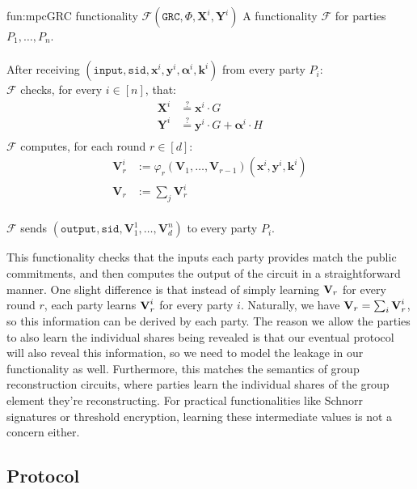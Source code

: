 \begin{afunctionality}{fun:mpc}{GRC functionality $\mathcal{F}(\texttt{GRC}, \Phi, \textbf{X}^i, \textbf{Y}^i)$}
A functionality $\mathcal{F}$ for parties $P_1, \ldots, P_n$.\\
\\
After receiving
$(\texttt{input}, \texttt{sid}, \textbf{x}^i, \textbf{y}^i, \boldsymbol{\alpha}^i, \textbf{k}^i)$ from every party $P_i$:\\
$\mathcal{F}$ checks, for every $i \in [n]$, that:
$$
\begin{aligned}
    \textbf{X}^i &\stackrel{?}{=} \textbf{x}^i \cdot G\\
    \textbf{Y}^i &\stackrel{?}{=} \textbf{y}^i \cdot G + \boldsymbol{\alpha}^i \cdot H\\
\end{aligned}
$$
$\mathcal{F}$ computes, for each round $r \in [d]$:
$$
\begin{aligned}
    \textbf{V}^i_{r} &:= \varphi_{r}(\textbf{V}_{1}, \ldots, \textbf{V}_{r - 1})(
        \textbf{x}^i, \textbf{y}^i, \textbf{k}^i
    )\\
    \textbf{V}_r &:= \sum_j \textbf{V}^i_r
\end{aligned}
$$\\
$\mathcal{F}$ sends $(\texttt{output}, \texttt{sid}, \textbf{V}^1_1, \ldots, \textbf{V}^n_d)$ to every party $P_i$.
\end{afunctionality}

This functionality checks that the inputs each party provides match
the public commitments, and then computes the output of the circuit
in a straightforward manner.
One slight difference is that instead of simply learning $\textbf{V}_r$ for
every round $r$, each party learns $\textbf{V}^i_r$ for every party $i$.
Naturally, we have $\textbf{V}_r = \sum_i \textbf{V}^i_r$, so this information
can be derived by each party.
The reason we allow the parties to also learn the individual shares
being revealed is that our eventual protocol will also reveal this
information, so we need to model the leakage in our functionality as well.
Furthermore, this matches the semantics of group reconstruction circuits,
where parties learn the individual shares of the group element they're
reconstructing.
For practical functionalities like Schnorr signatures or threshold encryption,
learning these intermediate values is not a concern either.

\subsection{Protocol}

